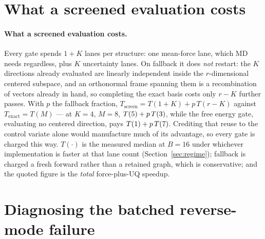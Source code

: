 \documentclass{article}
\begin{document}
\section{What a screened evaluation costs}
\label{app:cost}
\paragraph{What a screened evaluation costs.}
Every gate spends $1{+}K$ lanes per structure: one mean-force lane, which MD needs regardless, plus
$K$ uncertainty lanes. On fallback it does \emph{not} restart: the $K$ directions already evaluated
are linearly independent inside the $r$-dimensional centered subspace, and an orthonormal frame
spanning them is a recombination of vectors already in hand, so completing the exact basis costs
only $r{-}K$ further passes. With $p$ the fallback fraction,
$T_{\mathrm{screen}}=T(1{+}K)+p\,T(r{-}K)$ against $T_{\mathrm{exact}}=T(M)$ --- at $K{=}4$, $M{=}8$,
$T(5)+p\,T(3)$, while the free energy gate, evaluating no centered direction,
pays $T(1)+p\,T(7)$. Crediting that reuse to the control variate alone would
manufacture much of its advantage, so every gate is charged this way. $T(\cdot)$ is the measured
median at $B{=}16$ under whichever implementation is faster at that lane count
(Section~\ref{sec:regime}); fallback is charged a fresh forward rather than a retained graph, which
is conservative; and the quoted figure is the \emph{total} force-plus-UQ speedup.


\section{Diagnosing the batched reverse-mode failure}
\label{app:tensorexpr}
\end{document}
